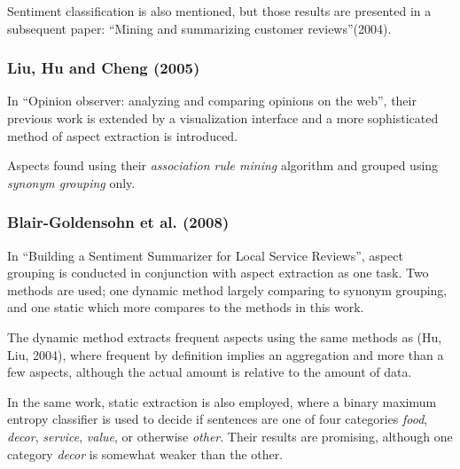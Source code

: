\documentclass[a4paper,11pt]{kth-mag}
\begin{document}
Sentiment classification is also mentioned, but those results are presented in a subsequent paper:
``Mining and summarizing customer reviews''(2004).


\subsubsection{Liu, Hu and Cheng (2005)}
In ``Opinion observer: analyzing and comparing opinions on the web'', their previous work is extended
by a visualization interface and a more sophisticated method of aspect extraction is introduced.

%
%

Aspects found using their \emph{association rule mining}\cite{ma1998integrating} algorithm
and grouped using \emph{synonym grouping} only. %

\subsubsection{Blair-Goldensohn et al. (2008)}
In ``Building a Sentiment Summarizer for Local Service Reviews''\cite{blair2008building}, aspect grouping is
conducted in conjunction with aspect extraction as one task.
Two methods are used; one dynamic method largely comparing to synonym grouping,
and one static which more compares to the methods in this work.

The dynamic method extracts frequent aspects using the same methods as (Hu, Liu, 2004),
where frequent by definition implies an aggregation and more than a few aspects,
although the actual amount is relative to the amount of data.

In the same work, static extraction is also employed, where a binary maximum entropy classifier
is used to decide if sentences are one of four categories \emph{food}, \emph{decor}, \emph{service}, \emph{value},
or otherwise \emph{other}.
Their results are promising, although one category \emph{decor} is somewhat weaker than the other.
\end{document}
